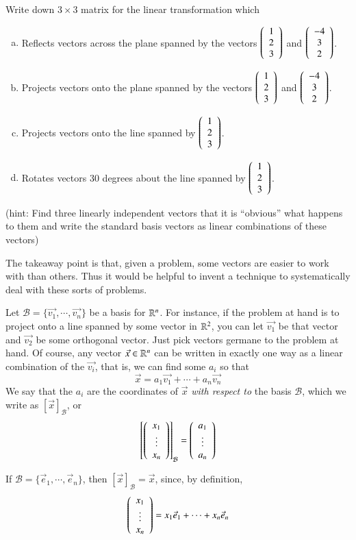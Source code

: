 \documentclass[Main.tex]{subfiles}
\begin{document}
\begin{TrickyEx}
  \label{sec:needbasis}
  Write down $3\times 3$ matrix for the linear transformation which
  \begin{enumerate}[a)]
  \indentitem \item Reflects vectors across the plane spanned by the vectors $\left(\begin{array}{c}1\\2\\3\\\end{array}\right)$ and $\left(\begin{array}{c}-4\\3\\2\end{array}\right)$.
  \item Projects vectors onto the plane spanned by the vectors $\left(\begin{array}{c}1\\2\\3\\\end{array}\right)$ and $\left(\begin{array}{c}-4\\3\\2\end{array}\right)$.
  \item Projects vectors onto the line spanned by $\left(\begin{array}{c}1\\2\\3\end{array}\right)$.
  \item Rotates vectors 30 degrees about the line spanned by $\left(\begin{array}{c}1\\2\\3\end{array}\right)$.
  \end{enumerate}
  (hint: Find three linearly independent vectors that it is ``obvious'' what happens to them and write the standard basis vectors as linear combinations of these vectors)
\end{TrickyEx}
The takeaway point is that, given a problem, some vectors are easier to work with than others.
Thus it would be helpful to invent a technique to systematically deal with these sorts of problems.


Let $\mathcal{B} = \{\vec{v_1},\cdots,\vec{v_n}\}$ be a basis for $\mathbb{R}^n$.
For instance, if the problem at hand is to project onto a line spanned by some vector in $\mathbb{R}^2$, you can let $\vec{v_1}$ be that vector and $\vec{v_2}$ be some orthogonal vector.
Just pick vectors germane to the problem at hand.
Of course, any vector $\vec{x}\in \mathbb{R}^n$ can be written in exactly one way as a linear combination of the $\vec{v_i}$, that is, we can find some $a_i$ so that 
\[\vec{x} = a_1\vec{v_1} + \cdots + a_n \vec{v_n}\]
We say that the $a_i$ are the coordinates of $\vec{x}$ \emph{with respect to} the basis $\mathcal{B}$, which we write as $[\vec{x}]_\mathcal{B}$, or
\[\left[\left(\begin{array}{c}x_1\\\vdots\\x_n\end{array}\right)\right]_\mathcal{B} = \left(\begin{array}{c}a_1\\\vdots\\a_n\end{array}\right)\]
\begin{Remark}
  If $\mathcal{B}=\{\vec{e}_1,\cdots,\vec{e}_n\}$, then $[\vec{x}]_\mathcal{B}=\vec{x}$, since, by definition, 
  \[\left(\begin{array}{c}x_1\\\vdots\\x_n\end{array}\right) = x_1\vec{e}_1 + \cdots + x_n\vec{e}_n\]
\end{Remark}
\end{document}
